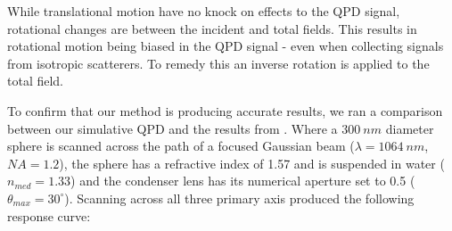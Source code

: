 While translational motion have no knock on effects to the QPD signal, 
rotational changes are between the incident and total fields. This results
in rotational motion being biased in the QPD signal - even when collecting
signals from isotropic scatterers. To remedy this an inverse rotation is
applied to the total field. 

To confirm that our method is producing accurate results, we ran a comparison
between our simulative QPD and the results from \cite{Rohrbach2002}. Where a 
$300\ nm$ diameter sphere is scanned across the path of a focused Gaussian beam
($\lambda=1064\ nm$, $NA=1.2$), the sphere has a refractive index of 1.57 and is
suspended in water ($n_{med}=1.33$) and the condenser lens has its numerical aperture
set to 0.5 ($\theta_{max} = 30^\circ$). Scanning across all three primary axis 
produced the following response curve:
